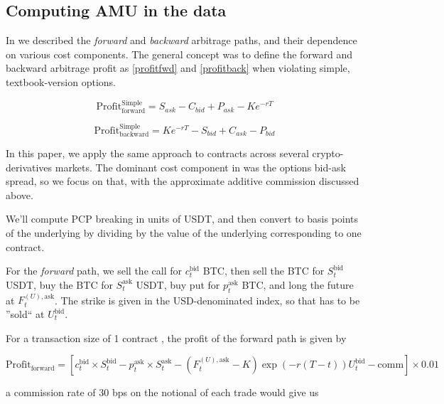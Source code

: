 \documentclass[12pt]{article}
\begin{document}
\subsection{Computing AMU in the data}

In \citet{felfoldi2024put} we described the \textit{forward} and \textit{backward} arbitrage paths, and their dependence on various cost components. The general concept was to define the forward and backward arbitrage profit as \ref{profitfwd} and \ref{profitback} when violating simple, textbook-version options.

\begin{equation}\label{profitfwd}
\text{Profit}^\text{Simple}_{\text{forward}}
=
S_{ask} - C_{bid} + P_{ask} - Ke^{-rT}
\end{equation}

\begin{equation}\label{profitback}
\text{Profit}^\text{Simple}_{\text{backward}}
=
Ke^{-rT} - S_{bid} + C_{ask} - P_{bid}
\end{equation}

In this paper, we apply the same approach to contracts across several crypto-derivatives markets. The dominant cost component in \citet{felfoldi2024put} was the options bid-ask spread, so we focus on that, with the approximate additive commission discussed above.

We'll compute PCP breaking in units of USDT, and then convert to basis points of the underlying by dividing by the value of the underlying corresponding to one contract.

For the \textit{forward} path, we sell the call for $c_t^\text{bid}$ BTC, then sell the BTC for $S_t^\text{bid}$ USDT, buy the BTC for $S_t^\text{ask}$ USDT, buy put for $p_t^\text{ask}$ BTC, and long the future at $F^{(U),\text{ask}}_t$. The strike is given in the USD-denominated index, so that has to be ''sold`` at $U_t^\text{bid}$.

For a transaction size of 1 contract , the profit of the forward path is given by

    \begin{equation}
    \text{Profit}_\text{forward} = \left[ c_t^\text{bid}\times S_t^\text{bid} - p_t^\text{ask}\times S_t^\text{ask} - (F^{(U),\text{ask}}_t - K)\exp\left(-r(T-t)\right) U_t^\text{bid} - \text{comm} \right] \times 0.01
    \end{equation}

a commission rate of 30 bps on the notional of each trade would give us
\end{document}
